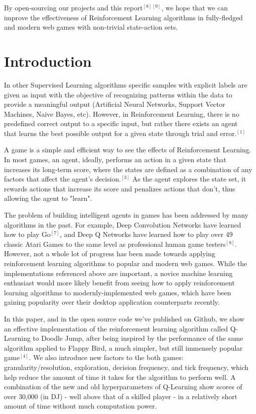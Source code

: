 \documentclass[a4paper, 12pt]{article}
\begin{document}
By open-sourcing our projects and this report$^{[8]}$$^{[9]}$, we hope that we can improve the effectiveness of Reinforcement Learning algorithms in fully-fledged and modern web games with non-trivial state-action sets.

\section{Introduction}
In other Supervised Learning algorithms specific samples with explicit labels are given as input with the objective of recognizing patterns within the data to provide a meaningful output (Artificial Neural Networks, Support Vector Machines, Naive Bayes, etc). However, in Reinforcement Learning, there is no predefined correct output to a specific input, but rather there exists an agent that learns the best possible output for a given state through trial and error.$^{[1]}$

A game is a simple and efficient way to see the effects of Reinforcement Learning. In most  games, an agent, ideally, performs an action in a given state that increases its long-term score, where the states are defined as a combination of any factors that affect the agent's decision.$^{[3]}$ As the agent explores the state set, it rewards actions that increase its score and penalizes actions that don't, thus allowing the agent to "learn".

The problem of building intelligent agents in games has been addressed by many algorithms in the past. For example, Deep Convolution Networks have learned how to play Go$^{[7]}$, and Deep Q Networks have learned how to play over 49 classic Atari Games to the same level as professional human game testers$^{[8]}$. However, not a whole lot of progress has been made towards applying reinforcement learning algorithms to popular and modern web games. While the implementations referenced above are important, a novice machine learning enthusiast would more likely benefit from seeing how to apply reinforcement learning algorithms to modernly-implemented web games, which have been gaining popularity over their desktop application counterparts recently.

In this paper, and in the open source code we've published on Github, we show an effective implementation of the reinforcement learning algorithm called Q-Learning to Doodle Jump, after being inspired by the performance of the same algorithm applied to Flappy Bird, a much simpler, but still immensely popular game$^{[4]}$. We also introduce new factors to the both games: granularity/resolution, exploration, decision frequency, and tick frequency, which help reduce the amount of time it takes for the algorithm to perform well. A combination of the new and old hyperparameters of Q-Learning show scores of over 30,000 (in DJ) - well above that of a skilled player - in a relatively short amount of time without much computation power.
\end{document}
